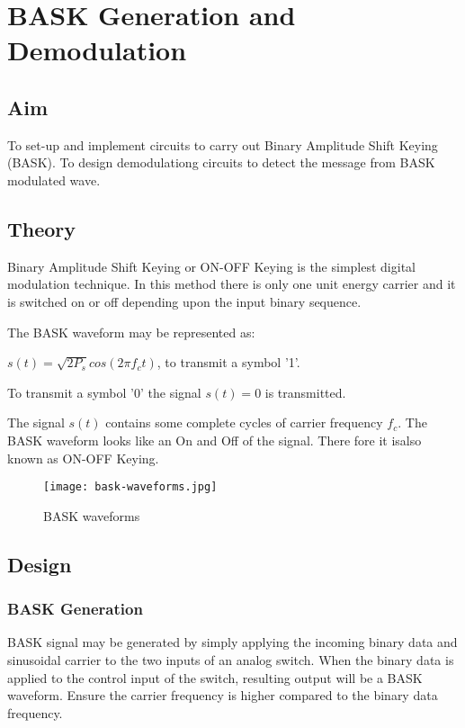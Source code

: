 \chapter[BASK Generation and Demodulation]{BASK Generation and Demodulation}

\section*{Aim}
To set-up and implement circuits to carry out Binary Amplitude Shift Keying (BASK). To design demodulationg circuits to detect the message from BASK modulated wave.
\section*{Theory}

Binary Amplitude Shift Keying or ON-OFF Keying is the simplest digital modulation technique. In this method there is only one unit energy carrier and it is switched on or off depending upon the input binary sequence.

The BASK waveform may be represented as:

$ s(t) = \sqrt{2P_s} cos (2\pi f_ct) $, to transmit a symbol '1'.

To transmit a symbol '0' the signal $ s(t) =0 $ is transmitted. 

The signal $s(t)$ contains some complete cycles of carrier frequency $f_c$. The BASK waveform looks like an On and Off of the signal. There fore it isalso known as ON-OFF Keying.

\begin{figure}[h]
\texttt{[image: bask-waveforms.jpg]}
\caption{BASK waveforms}
\label{baskmod}
\end{figure}


\section*{Design}
\subsection*{BASK Generation}

BASK signal may be generated by simply applying the incoming binary data and sinusoidal carrier to the two inputs of an analog switch. When the binary data is applied to the control input of the switch, resulting output will be a BASK waveform. Ensure the carrier frequency is higher compared to the binary data frequency. 


